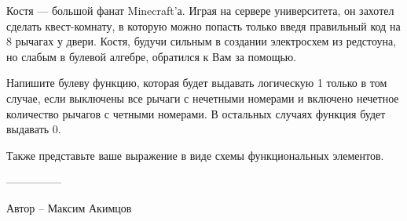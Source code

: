 \question
Костя — большой фанат Minecraft’а. Играя на сервере университета, он захотел сделать квест-комнату, в которую можно попасть только введя правильный код на 8 рычагах у двери. Костя, будучи сильным в создании электросхем из редстоуна, но слабым в булевой алгебре, обратился к Вам за помощью. 

Напишите булеву функцию, которая будет выдавать логическую 1 только в том случае, если выключены все рычаги с нечетными номерами и включено нечетное количество рычагов с четными номерами. В остальных случаях функция будет выдавать 0. 

Также представьте ваше выражение в виде схемы функциональных элементов.

---------------

Автор -- Максим Акимцов